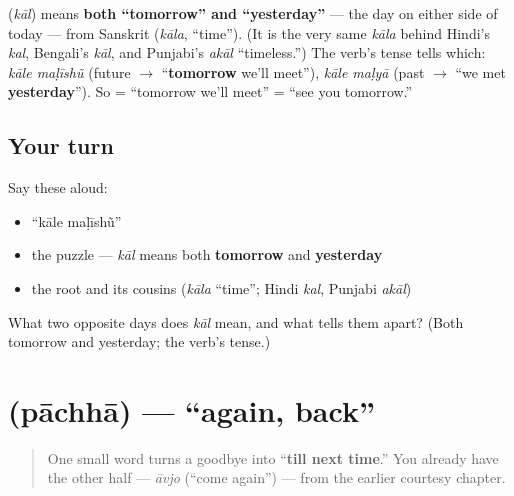 \begin{cousinweb}
\textbf{} (\emph{kāl}) means \textbf{both \textquotedblleft{}tomorrow\textquotedblright{} and \textquotedblleft{}yesterday\textquotedblright{}} — the day on either side of today — from Sanskrit \textbf{} (\emph{kāla}, \textquotedblleft{}time\textquotedblright{}). (It is the very same \emph{kāla} behind Hindi's \emph{kal}, Bengali's \emph{kāl}, and Punjabi's \emph{akāl} \textquotedblleft{}timeless.\textquotedblright{}) The verb's tense tells which: \emph{kāle maḷīshũ} (future $\to$ \textquotedblleft{}\textbf{tomorrow} we'll meet\textquotedblright{}), \emph{kāle maḷyā} (past $\to$ \textquotedblleft{}we met \textbf{yesterday}\textquotedblright{}). So \textbf{ } = \textquotedblleft{}tomorrow we'll meet\textquotedblright{} = \textquotedblleft{}see you tomorrow.\textquotedblright{}
\end{cousinweb}

\subsection*{Your turn}
Say these aloud:

\begin{itemize}
\raggedright
  \item \textquotedblleft{}kāle maḷīshũ\textquotedblright{}
  \item the puzzle — \emph{kāl} means both \textbf{tomorrow} and \textbf{yesterday}
  \item the root and its cousins (\emph{kāla} \textquotedblleft{}time\textquotedblright{}; Hindi \emph{kal}, Punjabi \emph{akāl})
\end{itemize}

\begin{tcolorbox}[breakable,colback=teal!4,colframe=teal!35!black,title={Before you move on}]
What two opposite days does \emph{kāl} mean, and what tells them apart? (Both tomorrow and yesterday; the verb's tense.)
\end{tcolorbox}
\section[\gu{પાછા}]{ (pāchhā) — \textquotedblleft{}again, back\textquotedblright{}}

\label{lesson:GU-C04-pachha}



\begin{quote}
One small word turns a goodbye into \textquotedblleft{}\textbf{till next time}.\textquotedblright{} You already have the other half — \emph{āvjo} (\textquotedblleft{}come again\textquotedblright{}) — from the earlier courtesy chapter.
\end{quote}


